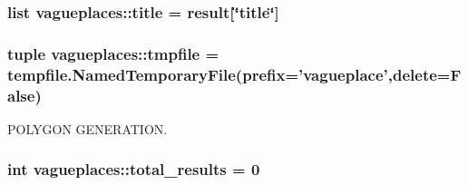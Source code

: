 \hypertarget{namespacevagueplaces_a967dc293801b4684884a9841274c9591}{
\subsubsection[{title}]{\setlength{\rightskip}{0pt plus 5cm}list {\bf vagueplaces\-::title} = result\mbox{[}\char`\"{}title\char`\"{}\mbox{]}}}\label{namespacevagueplaces_a967dc293801b4684884a9841274c9591}
\hypertarget{namespacevagueplaces_a3b9ac6b99db27960b0431390dcd551cd}{
\subsubsection[{tmpfile}]{\setlength{\rightskip}{0pt plus 5cm}tuple {\bf vagueplaces\-::tmpfile} = tempfile.\-Named\-Temporary\-File(prefix='vagueplace',delete=\-False)}}\label{namespacevagueplaces_a3b9ac6b99db27960b0431390dcd551cd}


\-P\-O\-L\-Y\-G\-O\-N \-G\-E\-N\-E\-R\-A\-T\-I\-O\-N. 

\hypertarget{namespacevagueplaces_aa2411570d3d42e5c2daf01af8c980b20}{
\subsubsection[{total\-\_\-results}]{\setlength{\rightskip}{0pt plus 5cm}int {\bf vagueplaces\-::total\-\_\-results} = 0}}\label{namespacevagueplaces_aa2411570d3d42e5c2daf01af8c980b20}
